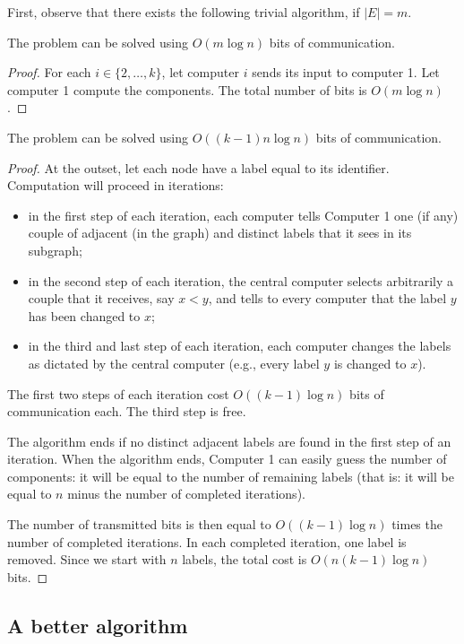First, observe that there exists the following trivial algorithm, if $|E| = m$.
\begin{thm}
The problem can be solved using $O(m \log n)$  bits of communication.
\end{thm}
\begin{proof}
For each $i \in \{2,\ldots, k\}$, let computer $i$ sends its input to computer 1. Let computer 1 compute the   components. The total number of bits is $O(m \log n)$.
\end{proof}
\begin{thm}
The problem can be solved using $O((k-1)n \log n)$ bits of communication.
\end{thm}
\begin{proof}
At the outset, let each node have a label equal to its identifier. Computation will proceed in iterations:\begin{itemize}
\item in the first step of each iteration, each computer tells Computer 1 one (if any) couple of adjacent (in the graph) and distinct labels that it sees in its subgraph;
\item in the second step of each iteration, the central computer selects
arbitrarily a couple that it receives, say $x<y$, and tells to every
computer that the label $y$ has been changed to $x$;
\item in the third and last step of each iteration, each computer changes the labels
as dictated by the central computer (e.g., every label $y$ is changed to
$x$).
\end{itemize}
The first two steps of each iteration cost $O((k-1) \log n)$ bits of communication each. The third step is free.


 
The algorithm ends if no distinct adjacent labels are found in the
first step of an iteration. When the algorithm ends, Computer 1 can easily guess the number of components: it will be equal
to the number of remaining labels (that is: it will be equal to $n$
minus the number of completed iterations).

The number of transmitted bits  is then equal to $O((k-1) \log n)$ times the number of
completed iterations. In each completed iteration, one label is
removed. Since we start with $n$ labels, the total
cost is $O(n (k-1) \log n)$ bits.
\end{proof}

\subsection{A better algorithm}

